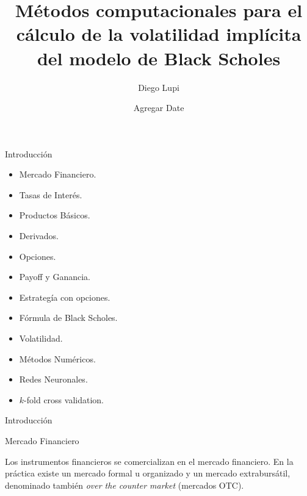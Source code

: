 \documentclass{beamer}
\title[]{M\'etodos computacionales para el c\'alculo de la volatilidad impl\'icita del modelo de Black Scholes}
\author[]{Diego Lupi}
\institute[]
{
  Universidad Nacional de C\'ordoba\\
  FaMAF
}
\date{Agregar Date}
\begin{document}
\frame{\titlepage}

\begin{frame}{Introducci\'on}

\begin{itemize}

    \item Mercado Financiero.
    
    \item Tasas de Inter\'es.

    \item Productos B\'asicos.
    
    \item Derivados.

    \item Opciones.

    \item Payoff y Ganancia.

    \item Estrateg\'ia con opciones.

    \item F\'ormula de Black Scholes.

    \item Volatilidad.

    \item M\'etodos Num\'ericos.

    \item Redes Neuronales.

    \item $k$-fold cross validation.


\end{itemize}
\end{frame}

\begin{frame}{Introducci\'on}

    \begin{block}{Mercado Financiero}

    Los instrumentos financieros se comercializan en el mercado financiero. En la pr\'actica existe
    un mercado formal u organizado y un mercado extraburs\'atil, denominado tambi\'en \textit{over the counter market} (mercados OTC).

    \end{block}

\end{frame}
\end{document}
